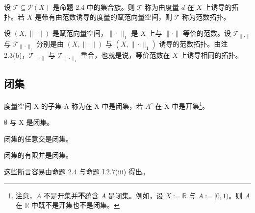 \begin{remark}

\begin{items}
\item

设 $ \mathcal{T} \subseteq \mathcal{P}(X) $ 是命题 2.4 中的集合族。则 $ \mathcal{T} $ 称为由度量 $ d $ 在 $ X $ 上诱导的拓扑。若 $ X $ 是带有由范数诱导的度量的赋范向量空间，则 $ \mathcal{T} $ 称为范数拓扑。

\item

设 $(X,\|\cdot\|)$ 是赋范向量空间，$\|\cdot\|_1$ 是 $X$ 上与 $\|\cdot\|$ 等价的范数。设 $\mathcal{T}_{\|\cdot\|}$ 与 $\mathcal{T}_{\|\cdot\|_1}$ 分别是由 $(X,\|\cdot\|)$ 与 $(X,\|\cdot\|_1)$ 诱导的范数拓扑。由注 2.3(b)，$\mathcal{T}_{\|\cdot\|}$ 与 $\mathcal{T}_{\|\cdot\|_1}$ 重合，也就是说，等价范数在 $X$ 上诱导相同的拓扑。

\end{items}

\end{remark}

\subsection*{闭集}

度量空间 X 的子集 A 称为在 X 中是闭集，若 $ A^{c} $ 在 X 中是开集\footnote{注意，$ A $ 不是开集并\textbf{不}蕴含 $ A $ 是闭集。例如，设 $ X := \mathbb{R} $ 与 $ A := [0, 1) $。则 $ A $ 在 $ \mathbb{R} $ 中既不是开集也不是闭集。}。

\begin{proposition}

\begin{subitems}
\item

$ \emptyset $ 与 X 是闭集。

\item

闭集的任意交是闭集。

\item

闭集的有限并是闭集。

\proofhead
这些断言容易由命题 2.4 与命题 I.2.7(iii) 得出。
\end{subitems}

\end{proposition}

